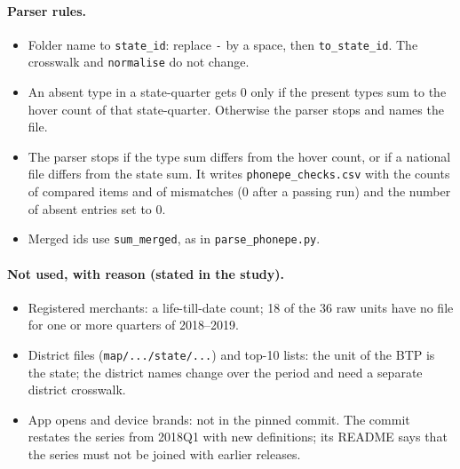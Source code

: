\documentclass[11pt,a4paper]{article}
\newcommand{\f}[1]{\texttt{#1}}
\begin{document}
\paragraph{Parser rules.}
\begin{itemize}
  \item Folder name to \f{state\_id}: replace \f{-} by a space, then \f{to\_state\_id}. The crosswalk
        and \f{normalise} do not change.
  \item An absent type in a state-quarter gets 0 only if the present types sum to the hover count of that
        state-quarter. Otherwise the parser stops and names the file.
  \item The parser stops if the type sum differs from the hover count, or if a national file differs
        from the state sum. It writes \f{phonepe\_checks.csv} with the counts of compared items and of
        mismatches (0 after a passing run) and the number of absent entries set to 0.
  \item Merged ids use \f{sum\_merged}, as in \f{parse\_phonepe.py}.
\end{itemize}

\paragraph{Not used, with reason (stated in the study).}
\begin{itemize}
  \item Registered merchants: a life-till-date count; 18 of the 36 raw units have no file for one or
        more quarters of 2018--2019.
  \item District files (\f{map/.../state/...}) and top-10 lists: the unit of the BTP is the state; the
        district names change over the period and need a separate district crosswalk.
  \item App opens and device brands: not in the pinned commit. The commit restates the series from
        2018Q1 with new definitions; its README says that the series must not be joined with earlier
        releases.
\end{itemize}
\end{document}
